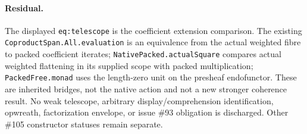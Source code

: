 \documentclass[11pt]{article}
\newcommand{\code}[1]{\texttt{#1}}
\begin{document}
\paragraph{Residual.}
The displayed \verb|eq:telescope| is the coefficient extension comparison. The existing \code{CoproductSpan.All.evaluation} is an equivalence from the actual weighted fibre to packed coefficient iterates; \code{NativePacked.actualSquare} compares actual weighted flattening in its supplied scope with packed multiplication; \code{PackedFree.monad} uses the length-zero unit on the presheaf endofunctor. These are inherited bridges, not the native action and not a new stronger coherence result. No weak telescope, arbitrary display/comprehension identification, opwreath, factorization envelope, or issue \#93 obligation is discharged. Other \#105 constructor statuses remain separate.
\end{document}
